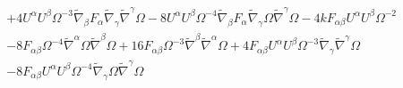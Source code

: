 \documentclass[10pt,letterpaper]{article}
\numberwithin{equation}{section}
\begin{document}
\begin{eqnarray}
&& + 4 U^{\alpha } U^{\beta } \Omega^{-3} \tilde{\nabla}_{\beta }F_{\alpha } \tilde{\nabla}_{\gamma }\tilde{\nabla}^{\gamma }\Omega - 8 U^{\alpha } U^{\beta } \Omega^{-4} \tilde{\nabla}_{\beta }F_{\alpha } \tilde{\nabla}_{\gamma }\Omega \tilde{\nabla}^{\gamma }\Omega -4 k F_{\alpha \beta } U^{\alpha } U^{\beta } \Omega^{-2} \nonumber \\ 
&& - 8 F_{\alpha \beta } \Omega^{-4} \tilde{\nabla}^{\alpha }\Omega \tilde{\nabla}^{\beta }\Omega + 16 F_{\alpha \beta } \Omega^{-3} \tilde{\nabla}^{\beta }\tilde{\nabla}^{\alpha }\Omega + 4 F_{\alpha \beta } U^{\alpha } U^{\beta } \Omega^{-3} \tilde{\nabla}_{\gamma }\tilde{\nabla}^{\gamma }\Omega \nonumber \\ 
&& - 8 F_{\alpha \beta } U^{\alpha } U^{\beta } \Omega^{-4} \tilde{\nabla}_{\gamma }\Omega \tilde{\nabla}^{\gamma }\Omega 
\end{eqnarray}
%
%
\end{document}
